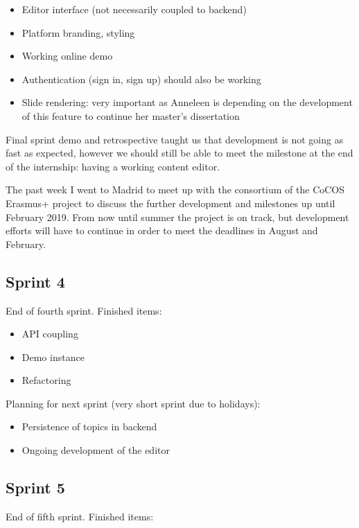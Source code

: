 \documentclass[10pt,a4paper]{article}
\begin{document}
\begin{appendices}
{        \begin{itemize}
          \item Editor interface (not necessarily coupled to backend)
          \item Platform branding, styling
          \item Working online demo
          \item Authentication (sign in, sign up) should also be working
          \item Slide rendering: very important as Anneleen is depending on the development of this feature to continue her master's dissertation
        \end{itemize}

        Final sprint demo and retrospective taught us that development is not going as fast as expected, however we should still be able to meet the milestone at the end of the internship: having a working content editor.

        The past week I went to Madrid to meet up with the consortium of the CoCOS Erasmus+ project to discuss the further development and milestones up until February 2019.
        From now until summer the project is on track, but development efforts will have to continue in order to meet the deadlines in August and February.

      \subsection*{Sprint 4}
        End of fourth sprint. Finished items:

        \begin{itemize}
          \item API coupling
          \item Demo instance
          \item Refactoring
        \end{itemize}

        Planning for next sprint (very short sprint due to holidays):

        \begin{itemize}
          \item Persistence of topics in backend
          \item Ongoing development of the editor
        \end{itemize}

      \subsection*{Sprint 5}
        End of fifth sprint. Finished items:

}
\end{appendices}
\end{document}
